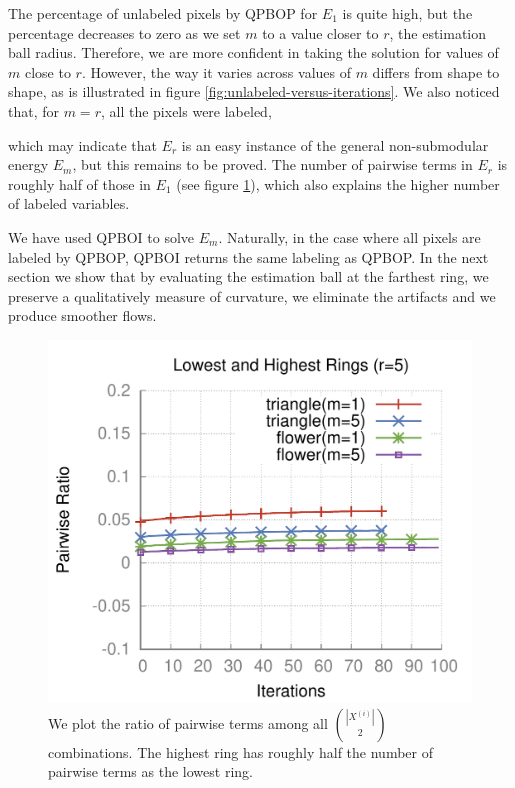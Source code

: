 The percentage of unlabeled pixels by QPBOP for $E_1$ is quite high, but the percentage decreases to zero as we set $m$
to a value closer to $r$, the estimation ball radius. Therefore, we are more confident in taking the solution for values of $m$ close to $r$. However, the way it
varies across values of $m$ differs from shape to shape, as is illustrated in figure
\ref{fig:unlabeled-versus-iterations}. We also noticed that, for $m=r$, all the pixels were labeled, {which may
  indicate that $E_r$ is an easy instance of the general non-submodular energy $E_m$, but this remains to be
  proved. The number of pairwise terms in $E_r$ is roughly half of those in $E_1$ (see figure
  \ref{fig:ratio-pairwise-terms}), which also explains the higher number of labeled variables.

  We have used QPBOI to solve $E_m$. Naturally, in the case where all pixels are labeled by QPBOP, QPBOI returns the same labeling as QPBOP. In the next section we show that by evaluating the estimation ball at the farthest ring, we preserve a qualitatively measure of curvature, we eliminate the artifacts and we produce smoother flows.


\begin{figure}
\center
\includegraphics[scale=0.5]{figures/chapter6/unlabeled-ratio/plots/pairwise-ratio/h0.25/radius-5/plot-pairwiseratio-lowerHigher-concavities-probe.pdf}
\caption{We plot the ratio of pairwise terms among all $\binom{|X^{(i)}|}{2}$ combinations. The highest ring has roughly half the number of pairwise terms as the lowest ring.}
\label{fig:ratio-pairwise-terms}
\end{figure}


}
